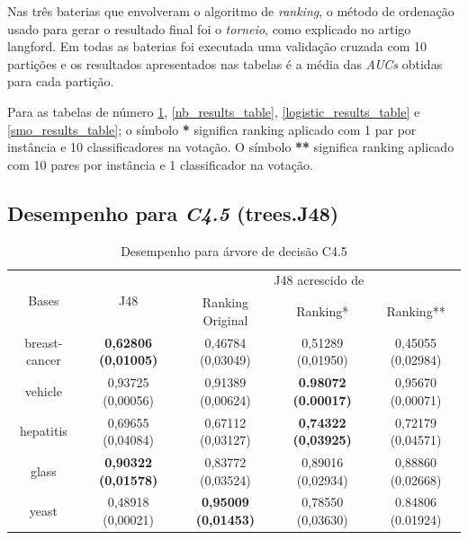 Nas três baterias que envolveram o algoritmo de \emph{ranking}, o método de ordenação usado para gerar o resultado final foi o \emph{torneio}, como explicado no artigo {{langford}}. Em todas as baterias foi executada uma validação cruzada com 10 partições e os resultados apresentados nas tabelas é a média das \emph{AUCs} obtidas para cada partição.

Para as tabelas de número \ref{j48_results_table}, \ref{nb_results_table}, \ref{logistic_results_table} e \ref{smo_results_table}; o símbolo \textbf{*} significa ranking aplicado com 1 par por instância e 10 classificadores na votação. O símbolo \textbf{**} significa ranking aplicado com 10 pares por instância e 1 classificador na votação.

\clearpage
\pagebreak

\subsection{Desempenho para \emph{C4.5} (trees.J48)}


\begin{table}[h!]
    \begin{tabular}{ c c c c c }
        \hline
    
        \multirow{2}{*}{Bases} & \multirow{2}{*}{J48} & \multicolumn{3}{c}{J48 acrescido de} \\ \cline{3-5}
        & & {\small Ranking Original} & {\small Ranking*} & {\small  Ranking**} \\

        \hline
        
        breast-cancer & {\small \textbf{0,62806 (0,01005)}} & {\small 0,46784 (0,03049)} & {\small 0,51289 (0,01950)} & {\small 0,45055 (0,02984)} \\
        vehicle & {\small 0,93725 (0,00056)} & {\small 0,91389 (0,00624)} & {\small \textbf{0.98072 (0.00017)}} & {\small 0,95670 (0,00071)} \\
        hepatitis & {\small 0,69655 (0,04084)} & {\small 0,67112 (0,03127)} & {\small \textbf{0,74322 (0,03925)}} & {\small 0,72179 (0,04571)} \\
        glass & {\small \textbf{0,90322 (0,01578)}} & {\small 0,83772 (0,03524)} & {\small 0,89016 (0,02934)} & {\small 0,88860 (0,02668)} \\
        yeast & {\small 0,48918 (0,00021)} & {\small \textbf{0,95009 (0,01453)}} & {\small 0,78550 (0,03630)} & {\small 0.84806 (0.01924)} \\
    
        \hline
    \end{tabular}
    
    \caption{Desempenho para árvore de decisão C4.5}
    \label{j48_results_table}
\end{table}

